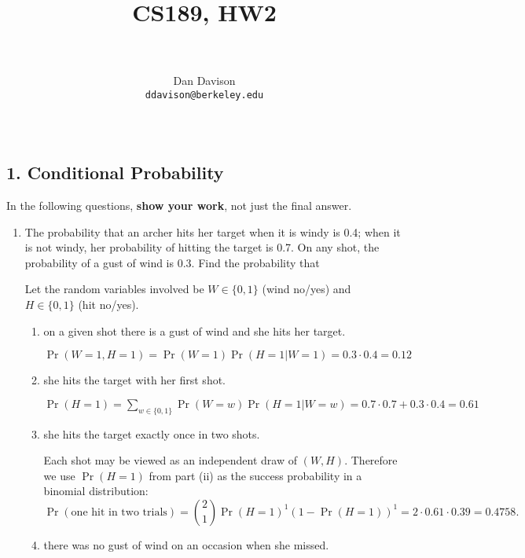 \documentclass{article}
\title{CS189, HW2}
\author{\vspace{-6ex} \\\\Dan Davison\\\texttt{ddavison@berkeley.edu}\\\\}
\date{\vspace{-6ex}}
\begin{document}
\maketitle

\subsection*{1. Conditional Probability}
In the following questions, \textbf{show your work}, not just the final answer.
\begin{enumerate}[label=(\alph*)]
\item The probability that an archer hits her target when it is windy is 0.4;
  when it is not windy, her probability of hitting the target is 0.7. On any
  shot, the probability of a gust of wind is 0.3. Find the probability that
  \begin{mdframed}
    Let the random variables involved be $W \in \{0, 1\}$ (wind no/yes) and
    $H \in \{0, 1\}$ (hit no/yes).
  \end{mdframed}
    \begin{enumerate}[label=(\roman*)]
        \item on a given shot there is a gust of wind and she hits her target.
          \begin{mdframed}
            $
            \Pr(W=1, H=1) = \Pr(W=1)\Pr(H=1|W=1) = 0.3 \cdot 0.4 = 0.12
            $
          \end{mdframed}
        \item she hits the target with her first shot.
          \begin{mdframed}
            $
            \Pr(H=1) = \sum_{w \in \{0, 1\}} \Pr(W=w) \Pr(H=1|W=w) = 0.7 \cdot 0.7 + 0.3 \cdot 0.4 = 0.61
            $
          \end{mdframed}
        \item she hits the target exactly once in two shots.
          \begin{mdframed}
            Each shot may be viewed as an independent draw of $(W,
            H)$. Therefore we use $\Pr(H=1)$ from part (ii) as the success
            probability in a binomial distribution:
            $$
            \Pr(\text{one hit in two trials}) = {2 \choose 1} \Pr(H=1)^1 \left(1 - \Pr(H=1)\right)^1 = 2 \cdot 0.61 \cdot 0.39 = 0.4758.
            $$
          \end{mdframed}
        \item there was no gust of wind on an occasion when she missed.
          \begin{mdframed}

\end{mdframed}
\end{enumerate}
\end{enumerate}
\end{document}
